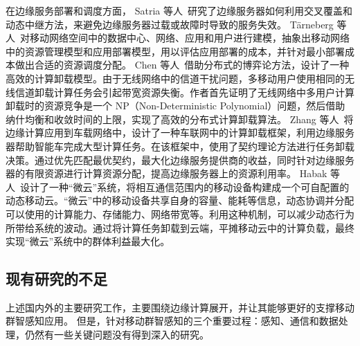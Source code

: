 在边缘服务部署和调度方面，
Satria 等人~\cite{DBLP:journals/fgcs/SatriaPJ17}研究了边缘服务器如何利用交叉覆盖和动态中继方法，来避免边缘服务器过载或故障时导致的服务失效。
T{\"{a}}rneberg 等人~\cite{DBLP:journals/fgcs/TarnebergMWTEKE17}对移动网络空间中的数据中心、网络、应用和用户进行建模，抽象出移动网络中的资源管理模型和应用部署模型，用以评估应用部署的成本，并针对最小部署成本做出合适的资源调度分配。
Chen 等人~\cite{DBLP:journals/ton/ChenJLF16}借助分布式的博弈论方法，设计了一种高效的计算卸载模型。由于无线网络中的信道干扰问题，多移动用户使用相同的无线信道卸载计算任务会引起带宽资源失衡。作者首先证明了无线网络中多用户计算卸载时的资源竞争是一个 NP（Non-Deterministic Polynomial）问题，然后借助纳什均衡和收敛时间的上限，实现了高效的分布式计算卸载算法。
Zhang 等人~\cite{DBLP:conf/rndm/ZhangMLV016}将边缘计算应用到车载网络中，设计了一种车联网中的计算卸载框架，利用边缘服务器帮助智能车完成大型计算任务。在该框架中，使用了契约理论方法进行任务卸载决策。通过优先匹配最优契约，最大化边缘服务提供商的收益，同时针对边缘服务器的有限资源进行计算资源分配，提高边缘服务器上的资源利用率。
Habak 等人~\cite{DBLP:conf/IEEEcloud/HabakAHZ15}设计了一种“微云”系统，将相互通信范围内的移动设备构建成一个可自配置的动态移动云。“微云”中的移动设备共享自身的容量、能耗等信息，动态协调并分配可以使用的计算能力、存储能力、网络带宽等。利用这种机制，可以减少动态行为所带给系统的波动。通过将计算任务卸载到云端，平摊移动云中的计算负载，最终实现“微云”系统中的群体利益最大化。




\subsection{现有研究的不足}


上述国内外的主要研究工作，主要围绕边缘计算展开，并让其能够更好的支撑移动群智感知应用。
但是，针对移动群智感知的三个重要过程：感知、通信和数据处理，仍然有一些关键问题没有得到深入的研究。

